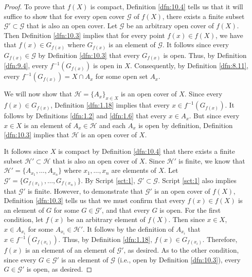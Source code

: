 \documentclass[../main.tex]{subfiles}
\begin{document}
\begin{theorem}
\begin{proof}
        To prove that $f(X)$ is compact, Definition \ref{dfn:10.4} tells us that it will suffice to show that for every open cover $\mathcal{G}$ of $f(X)$, there exists a finite subset $\mathcal{G}'\subset\mathcal{G}$ that is also an open cover. Let $\mathcal{G}$ be an arbitrary open cover of $f(X)$. Then Definition \ref{dfn:10.3} implies that for every point $f(x)\in f(X)$, we have that $f(x)\in G_{f(x)}$ where $G_{f(x)}$ is an element of $\mathcal{G}$. It follows since every $G_{f(x)}\in\mathcal{G}$ by Definition \ref{dfn:10.3} that every $G_{f(x)}$ is open. Thus, by Definition \ref{dfn:9.4}, every $f^{-1}(G_{f(x)})$ is open in $X$. Consequently, by Definition \ref{dfn:8.11}, every $f^{-1}(G_{f(x)})=X\cap A_x$ for some open set $A_x$.\par
        We will now show that $\mathcal{H}=\{A_x\}_{x\in X}$ is an open cover of $X$. Since every $f(x)\in G_{f(x)}$, Definition \ref{dfn:1.18} implies that every $x\in f^{-1}(G_{f(x)})$. It follows by Definitions \ref{dfn:1.2} and \ref{dfn:1.6} that every $x\in A_x$. But since every $x\in X$ is an element of $A_x\in\mathcal{H}$ and each $A_x$ is open by definition, Definition \ref{dfn:10.3} implies that $\mathcal{H}$ is an open cover of $X$.\par
        It follows since $X$ is compact by Definition \ref{dfn:10.4} that there exists a finite subset $\mathcal{H}'\subset\mathcal{H}$ that is also an open cover of $X$. Since $\mathcal{H}'$ is finite, we know that $\mathcal{H}'=\{A_{x_1},\dots,A_{x_n}\}$ where $x_1,\dots,x_n$ are elements of $X$. Let $\mathcal{G}'=\{G_{f(x_1)},\dots,G_{f(x_n)}\}$. By Script \ref{sct:1}, $\mathcal{G}'\subset\mathcal{G}$. Script \ref{sct:1} also implies that $\mathcal{G}'$ is finite. However, to demonstrate that $\mathcal{G}'$ is an open cover of $f(X)$, Definition \ref{dfn:10.3} tells us that we must confirm that every $f(x)\in f(X)$ is an element of $G$ for some $G\in\mathcal{G}'$, and that every $G$ is open. For the first condition, let $f(x)$ be an arbitrary element of $f(X)$. Then since $x\in X$, $x\in A_{x_i}$ for some $A_{x_i}\in\mathcal{H}'$. It follows by the definition of $A_{x_i}$ that $x\in f^{-1}(G_{f(x_i)})$. Thus, by Definition \ref{dfn:1.18}, $f(x)\in G_{f(x_i)}$. Therefore, $f(x)$ is an element of an element of $\mathcal{G}'$, as desired. As to the other condition, since every $G\in\mathcal{G}'$ is an element of $\mathcal{G}$ (i.e., open by Definition \ref{dfn:10.3}), every $G\in\mathcal{G}'$ is open, as desired.
    \end{proof}
\end{theorem}
\end{document}
